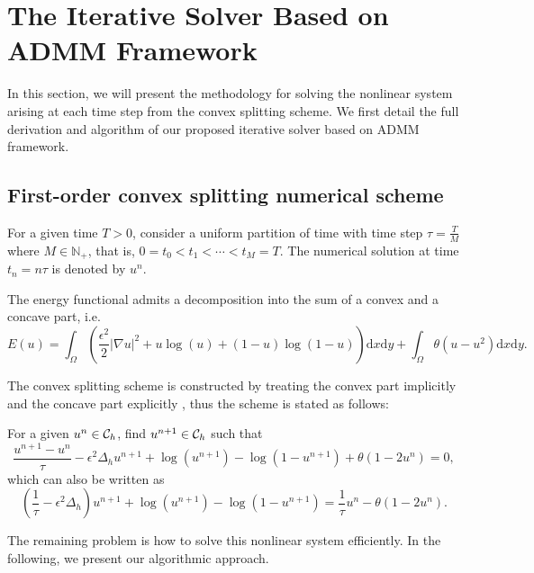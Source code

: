 \section{The Iterative Solver Based on ADMM Framework}
\label{section:admm}
In this section, we will present the methodology for solving the nonlinear system arising at each time step from the convex splitting scheme. 
We first detail the full derivation and algorithm of our proposed iterative solver based on ADMM framework. 

\subsection{First-order convex splitting numerical scheme}
For a given time $T>0$, consider a uniform partition of time with time step $\tau=\frac{T}{M}$ where $M\in \mathbb{N}_+$, that is, $0=t_0<t_1<\cdots<t_M=T$. 
The numerical solution at time $t_n=n\tau$ is denoted by $u^n$. 
\par The energy functional admits a decomposition into the sum of a convex and a concave part, i.e.
\begin{equation}
    E(u)=\int_{\Omega}(\frac{\epsilon^2}{2}|\nabla u|^2+u\log(u)+(1-u)\log(1-u))\text{d}x\text{d}y
    +\int_{\Omega}\theta (u-u^2)\text{d}x\text{d}y.
\end{equation}
\par The convex splitting scheme is constructed by treating the convex part implicitly and the concave part explicitly \cite{eyre1998unconditionally}, thus the scheme is stated as follows: 
\par For a given $u^n\in {\mathcal{C}_h}$, find $u^{n+1}\in {\mathcal{C}_h}$ such that
\begin{equation}
\label{scheme:cs}
    \frac{u^{n+1}-u^n}{\tau}-\epsilon^2\Delta_hu^{n+1}
    +\log(u^{n+1})-\log(1-u^{n+1})+\theta(1-2u^n)=0,
\end{equation}
which can also be written as\begin{equation}
\label{eq:cs}
    (\frac{1}{\tau}-\epsilon^2\Delta_h)u^{n+1}+\log(u^{n+1})-\log(1-u^{n+1})=\frac{1}{\tau}u^{n}-\theta(1-2u^n).
\end{equation}


The remaining problem is how to solve this nonlinear system efficiently. In the following, we present our algorithmic approach.
